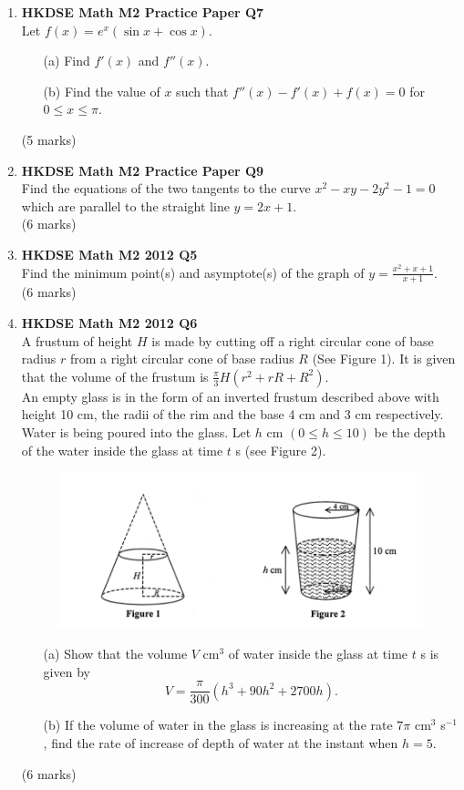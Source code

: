 \documentclass{report}
\begin{document}
\begin{enumerate}
	\item \textbf{HKDSE Math M2 Practice Paper Q7}\\
	Let $f(x) = e^x(\sin{x} + \cos{x})$. 
	\begin{enumerate}
		\item[(a)]Find $f'(x)$ and $f''(x)$. 
		\item[(b)]Find the value of $x$ such that $f''(x) - f'(x) + f(x) = 0$ for $0 \leq x \leq \pi$.
	\end{enumerate}
	(5 marks)

	\item \textbf{HKDSE Math M2 Practice Paper Q9}\\
	Find the equations of the two tangents to the curve $x^2 - xy -2y^2 -1 =0$ which are parallel to the straight line $y = 2x+1$. \\(6 marks)

	\item \textbf{HKDSE Math M2 2012 Q5}\\
	Find the minimum point(s) and asymptote(s) of the graph of $\displaystyle y = \frac{x^2+x+1}{x+1}$. \\(6 marks)

	\newpage

	\item \textbf{HKDSE Math M2 2012 Q6}\\
	A frustum of height $H$ is made by cutting off a right circular cone of base radius $r$ from a right circular cone of base radius $R$ (See Figure 1). It is given that the volume of the frustum is $\displaystyle\frac{\pi}{3}H(r^2 + rR + R^2)$. \\
	An empty glass is in the form of an inverted frustum described above with height 10 cm, the radii of the rim and the base 4 cm and 3 cm respectively. Water is being poured into the glass. Let $h$ cm $(0 \leq h \leq 10)$ be the depth of the water inside the glass at time $t$ s (see Figure 2).
	\begin{figure}[H]
		\centering
		\includegraphics[width = .6\linewidth]{2012Figure1n2}
	\end{figure}
	\begin{enumerate}
		\item [(a)]Show that the volume $V$ cm$^{3}$ of water inside the glass at time $t$ s is given by 
		$$V = \displaystyle\frac{\pi}{300}(h^3+90h^2+2700h).$$
		\item [(b)]If the volume of water in the glass is increasing at the rate $7\pi$ cm$^3$ s$^{-1}$, find the rate of increase of depth of water at the instant when $h = 5$.
	\end{enumerate}
	(6 marks)


\end{enumerate}
\end{document}
